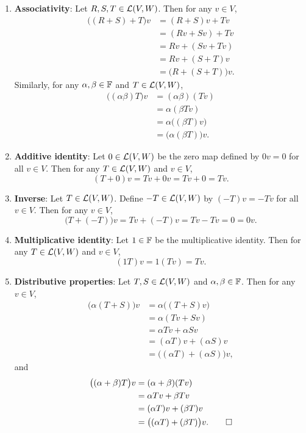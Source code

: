 \begin{solution}
\begin{enumerate}[label=\arabic*)]
\begin{align*}
    &= (T+S)v.
  \end{align*}
\item \textbf{Associativity}: Let $R,S,T\in\mathcal{L}(V,W)$. Then for any $v\in V$,
  \begin{align*}
  \bigl((R+S)+T\bigr)v &= (R+S)v+Tv\\
    &= (Rv+Sv)+Tv\\
    &= Rv+(Sv+Tv)\\
    &= Rv+(S+T)v\\
    &= \bigl(R+(S+T)\bigr)v.
  \end{align*}
  Similarly, for any $\alpha,\beta\in\mathbb{F}$ and $T\in\mathcal{L}(V,W)$,
  \begin{align*}
  \bigl((\alpha\beta)T\bigr)v &= (\alpha\beta)(Tv)\\
    &= \alpha(\beta Tv)\\
    &= \alpha\bigl((\beta T)v\bigr)\\
    &= \bigl(\alpha(\beta T)\bigr)v.
  \end{align*}
\item \textbf{Additive identity}: Let $0\in\mathcal{L}(V,W)$ be the zero map defined
  by $0v=0$ for all $v\in V$. Then for any $T\in\mathcal{L}(V,W)$ and $v\in V$,
  \[ (T+0)v=Tv+0v=Tv+0=Tv. \]
\item \textbf{Inverse}: Let $T\in\mathcal{L}(V,W)$. Define $-T\in\mathcal{L}(V,W)$ by
  $(-T)v=-Tv$ for all $v\in V$. Then for any $v\in V$,
  \[ \bigl(T+(-T)\bigr)v=Tv+(-T)v=Tv-Tv=0=0v. \]
\item \textbf{Multiplicative identity}: Let $1\in\mathbb{F}$ be the multiplicative
  identity. Then for any $T\in\mathcal{L}(V,W)$ and $v\in V$,
  \[ (1T)v=1(Tv)=Tv. \]
\item \textbf{Distributive properties}: Let $T,S\in\mathcal{L}(V,W)$ and
  $\alpha,\beta\in\mathbb{F}$. Then for any $v\in V$,
  \begin{align*}
  \bigl(\alpha(T+S)\bigr)v &= \alpha\bigl((T+S)v\bigr)\\
    &= \alpha(Tv+Sv)\\
    &= \alpha Tv+\alpha Sv\\
    &= (\alpha T)v+(\alpha S)v\\
    &= \bigl((\alpha T)+(\alpha S)\bigr)v,
  \end{align*}
  and
  \begin{align*}
  \bigl((\alpha+\beta)T\bigr)v &= (\alpha+\beta)(Tv)\\
    &= \alpha Tv+\beta Tv\\
    &= (\alpha T)v+(\beta T)v\\
    &= \bigl((\alpha T)+(\beta T)\bigr)v. \qedhere
  \end{align*}
\end{enumerate}
\end{solution}


